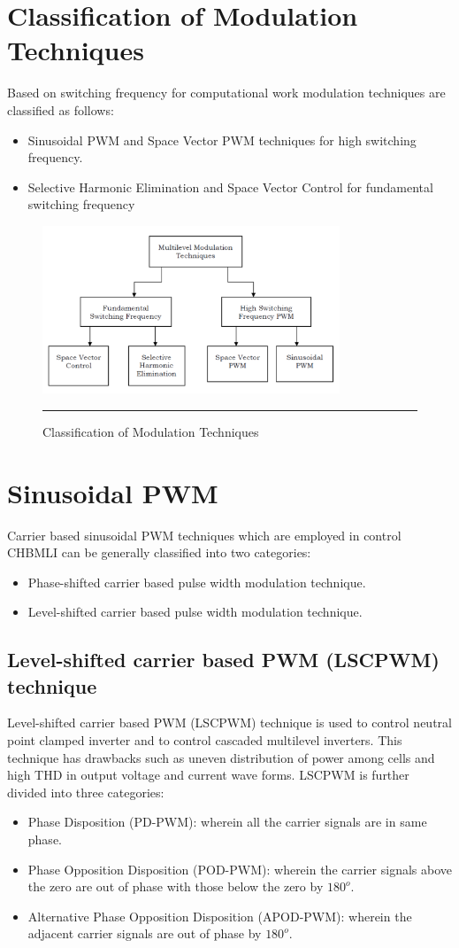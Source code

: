 \section{Classification of Modulation Techniques}
Based on switching frequency for computational work modulation techniques are classified as follows:
\begin{itemize}
\item Sinusoidal PWM and Space Vector PWM techniques for high switching frequency.
\item Selective Harmonic Elimination and Space Vector Control for fundamental switching frequency
\end{itemize}
\begin{figure}[htbp]
	\centering
		\includegraphics[width = 3.5in]{./Figures/Doc1.pdf}
		\rule{35em}{5pt}
	\caption{Classification of Modulation Techniques}
	\label{fig:9}
\end{figure}
\section{Sinusoidal PWM}
Carrier based sinusoidal PWM techniques which are employed in control CHBMLI can be
generally classified into two categories:
\begin{itemize}
\item Phase-shifted carrier based pulse width modulation technique.
\item Level-shifted carrier based pulse width modulation technique.
\end{itemize}
\subsection{Level-shifted carrier based PWM (LSCPWM) technique}
Level-shifted carrier based PWM (LSCPWM) technique is used to control neutral point clamped inverter and to control cascaded multilevel inverters. This technique has drawbacks such as uneven distribution of power among cells and high THD in output voltage and current wave forms.
LSCPWM is further divided into three categories:
\begin{itemize}
\item Phase Disposition (PD-PWM):
 wherein all the carrier signals are in same phase.
\item Phase Opposition Disposition (POD-PWM):
wherein the carrier signals above the zero are out of phase with those below the zero by $180^o$.
\item Alternative Phase Opposition Disposition (APOD-PWM):
 wherein the adjacent carrier signals are out of phase by $180^o$.
\end{itemize}
